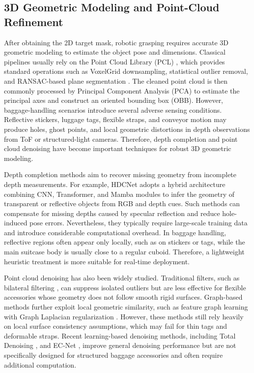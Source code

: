\subsection{3D Geometric Modeling and Point-Cloud Refinement}

After obtaining the 2D target mask, robotic grasping requires accurate 3D geometric modeling to estimate the object pose and dimensions. Classical pipelines usually rely on the Point Cloud Library (PCL) \cite{rusu20113d}, which provides standard operations such as VoxelGrid downsampling, statistical outlier removal, and RANSAC-based plane segmentation \cite{fischler1981random}. The cleaned point cloud is then commonly processed by Principal Component Analysis (PCA) to estimate the principal axes and construct an oriented bounding box (OBB). However, baggage-handling scenarios introduce several adverse sensing conditions. Reflective stickers, luggage tags, flexible straps, and conveyor motion may produce holes, ghost points, and local geometric distortions in depth observations from ToF or structured-light cameras. Therefore, depth completion and point cloud denoising have become important techniques for robust 3D geometric modeling.

Depth completion methods aim to recover missing geometry from incomplete depth measurements. For example, HDCNet \cite{xie2025hdcnet} adopts a hybrid architecture combining CNN, Transformer, and Mamba modules to infer the geometry of transparent or reflective objects from RGB and depth cues. Such methods can compensate for missing depths caused by specular reflection and reduce hole-induced pose errors. Nevertheless, they typically require large-scale training data and introduce considerable computational overhead. In baggage handling, reflective regions often appear only locally, such as on stickers or tags, while the main suitcase body is usually close to a regular cuboid. Therefore, a lightweight heuristic treatment is more suitable for real-time deployment.

Point cloud denoising has also been widely studied. Traditional filters, such as bilateral filtering \cite{digne2017bilateral, si2022lbf}, can suppress isolated outliers but are less effective for flexible accessories whose geometry does not follow smooth rigid surfaces. Graph-based methods further exploit local geometric similarity, such as feature graph learning with Graph Laplacian regularization \cite{hu2020feature}. However, these methods still rely heavily on local surface consistency assumptions, which may fail for thin tags and deformable straps. Recent learning-based denoising methods, including Total Denoising \cite{hermosilla2019total, rakotosaona2020pointcleannet}, and EC-Net \cite{yu2018ec}, improve general denoising performance but are not specifically designed for structured baggage accessories and often require additional computation.

